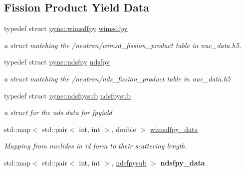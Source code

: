 \subsection*{Fission Product Yield Data}
\begin{DoxyCompactItemize}
\item 
\mbox{\label{namespacepyne_a8346e297aba51dd65836af1b9b1e22c6}} 
typedef struct \hyperlink{structpyne_1_1wimsdfpy}{pyne\+::wimsdfpy} \hyperlink{namespacepyne_a8346e297aba51dd65836af1b9b1e22c6}{wimsdfpy}
\begin{DoxyCompactList}\small\item\em a struct matching the \textquotesingle{}/neutron/wimsd\+\_\+fission\+\_\+product\textquotesingle{} table in nuc\+\_\+data.\+h5. \end{DoxyCompactList}\item 
\mbox{\label{namespacepyne_a96952abe65e3f7b41e1b8a93c123f5b1}} 
typedef struct \hyperlink{structpyne_1_1ndsfpy}{pyne\+::ndsfpy} \hyperlink{namespacepyne_a96952abe65e3f7b41e1b8a93c123f5b1}{ndsfpy}
\begin{DoxyCompactList}\small\item\em a struct matching the \textquotesingle{}/neutron/nds\+\_\+fission\+\_\+product\textquotesingle{} table in nuc\+\_\+data.\+h5 \end{DoxyCompactList}\item 
\mbox{\label{namespacepyne_a38819ae9154f678484f27f785b29c275}} 
typedef struct \hyperlink{structpyne_1_1ndsfpysub}{pyne\+::ndsfpysub} \hyperlink{namespacepyne_a38819ae9154f678484f27f785b29c275}{ndsfpysub}
\begin{DoxyCompactList}\small\item\em a struct for the nds data for fpyield \end{DoxyCompactList}\item 
std\+::map$<$ std\+::pair$<$ int, int $>$, double $>$ \hyperlink{namespacepyne_a2512ebcde5e39e49cd6ed25bb09ff374}{wimsdfpy\+\_\+data}
\begin{DoxyCompactList}\small\item\em Mapping from nuclides in id form to their scattering length. \end{DoxyCompactList}\item 
std\+::map$<$ std\+::pair$<$ int, int $>$, \hyperlink{structpyne_1_1ndsfpysub}{ndsfpysub} $>$ {\bfseries ndsfpy\+\_\+data}

\end{DoxyCompactItemize}
